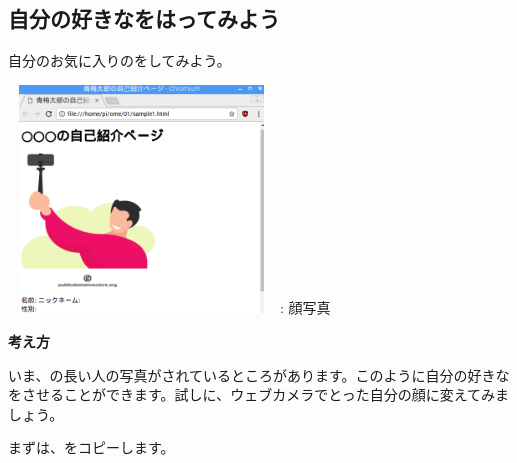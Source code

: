 \documentclass[a4paper,12pt]{jarticle}
\begin{document}
\subsection{\theExercise 自分の好きなをはってみよう}
\addtocounter{Exercise}{-1}\label{E:embImginHTML}
自分のお気に入りのをしてみよう。

\centering
\begin{minipage}{6.738cm}
  {\upshape
    \includegraphics[width=7.071cm,height=6.048cm]{textbook-img161.png}
    \newline
    : 顔写真}
\end{minipage}

\flushleft
\textbf{考え方}


いま、の長い人の写真がされているところがあります。このように自分の好きなをさせることができます。試しに、ウェブカメラでとった自分の顔に変えてみましょう。

まずは、をコピーします。


\bigskip
\end{document}
